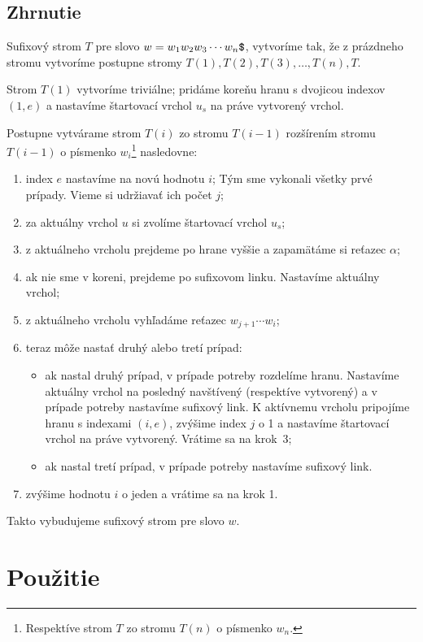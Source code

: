 \subsection{Zhrnutie}

Sufixový strom $T$ pre slovo $w = w_1w_2w_3\cdots w_n\hbox{\tt\$}$, vytvoríme tak, že z 
prázdneho stromu vytvoríme postupne stromy $T(1), T(2), T(3),\ldots, T(n), T$. 

Strom $T(1)$ vytvoríme triviálne; pridáme koreňu hranu s dvojicou indexov 
$(1, e)$ a nastavíme štartovací vrchol $u_s$ na práve vytvorený vrchol.

Postupne vytvárame strom $T(i)$ zo stromu $T(i-1)$ rozšírením stromu 
$T(i-1)$ o písmenko $w_i$\footnote{Respektíve strom $T$ zo stromu 
$T(n)$ o písmenko $w_n$.} nasledovne:

\begin{enumerate}
\item index $e$ nastavíme na novú hodnotu $i$; 
Tým sme vykonali všetky prvé prípady. Vieme si udržiavať ich počet $j$;
\item za aktuálny vrchol $u$ si zvolíme štartovací vrchol $u_s$;
\item z aktuálneho vrcholu prejdeme po hrane vyššie a zapamätáme si reťazec 
$\alpha$;
\item ak nie sme v koreni, prejdeme po sufixovom linku. Nastavíme aktuálny 
vrchol;
\item z aktuálneho vrcholu vyhľadáme reťazec $w_{j+1}\cdots w_i$;
\item teraz môže nastať druhý alebo tretí prípad:
\begin{itemize}
\item ak nastal druhý prípad, v prípade potreby rozdelíme hranu. Nastavíme 
aktuálny vrchol na posledný navštívený (respektíve vytvorený) a v prípade 
potreby nastavíme sufixový link. K aktívnemu vrcholu pripojíme hranu s 
indexami $(i,e)$, zvýšime index $j$ o 1 a nastavíme štartovací vrchol na 
práve vytvorený. Vrátime sa na krok~3;
\item ak nastal tretí prípad, v prípade potreby nastavíme sufixový link.
\end{itemize}
\item zvýšime hodnotu $i$ o jeden a vrátime sa na krok 1.
\end{enumerate}
 
Takto vybudujeme sufixový strom pre slovo $w$.

\section{Použitie}

